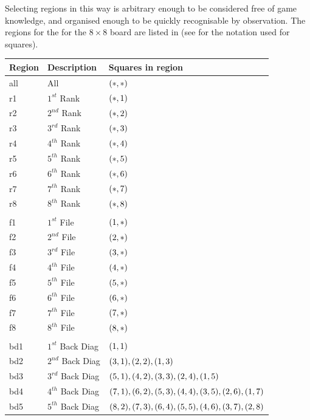 Selecting regions in this way is arbitrary enough to be considered free of game knowledge, and organised enough to be quickly recognisable by observation.  The  regions for the  for the $8 \times 8$ board are listed in  (see  for the notation used for squares).
\begin{table}[h!]
\small
\centering
	\begin{tabular} {|l|l|l|}
	\hline
  \textbf{Region} & {\bf Description} & {\bf Squares in region}\\
	\hline
all & All & $(*,*) $ \\
r1 & $1^{st}$ Rank & $(*,1)$ \\
r2 & $2^{nd}$ Rank & $(*,2)$ \\
r3 & $3^{rd}$ Rank & $(*,3)$ \\
r4 & $4^{th}$ Rank & $(*,4)$ \\
r5 & $5^{th}$ Rank & $(*,5)$ \\
r6 & $6^{th}$ Rank & $(*,6)$ \\
r7 & $7^{th}$ Rank & $(*,7)$ \\
r8 & $8^{th}$ Rank & $(*,8)$ \\
&&\\
f1 & $1^{st}$ File & $(1,*) $ \\
f2 & $2^{nd}$ File & $(2,*) $ \\
f3 & $3^{rd}$ File & $(3,*) $ \\
f4 & $4^{th}$ File & $(4,*) $ \\
f5 & $5^{th}$ File & $(5,*) $ \\
f6 & $6^{th}$ File & $(6,*) $ \\
f7 & $7^{th}$ File & $(7,*) $ \\
f8 & $8^{th}$ File & $(8,*) $ \\
&&\\
bd1 & $1^{st}$ Back Diag & $ (1,1) $\\
bd2 & $2^{nd}$ Back Diag & $ (3,1), (2,2), (1,3) $\\
bd3 & $3^{rd}$ Back Diag & $ (5,1), (4,2), (3,3), (2,4), (1,5) $\\
bd4 & $4^{th}$ Back Diag & $ (7,1), (6,2), (5,3), (4,4), (3,5), (2,6), (1,7)$\\
bd5 & $5^{th}$ Back Diag & $ (8,2), (7,3), (6,4), (5,5), (4,6), (3,7), (2,8) $\\

\end{tabular}
\end{table}
